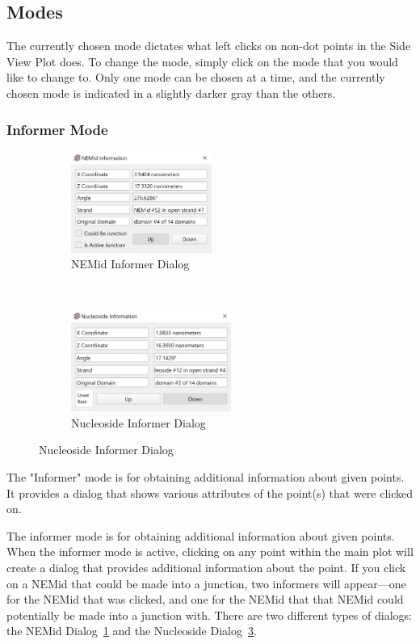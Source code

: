 \documentclass[titlepage]{article}
\begin{document}
	\subsection{Modes}
	The currently chosen mode dictates what left clicks on non-dot points in the Side View Plot does. To change the mode, simply click on the mode that you would like to change to. Only one mode can be chosen at a time, and the currently chosen mode is indicated in a slightly darker gray than the others.
	
	\subsubsection{Informer Mode}
	
	\begin{figure}[h]
		\caption{Informer Dialogs}
		\centering
		\begin{subfigure}{.3\textheight}
			\centering
			\includegraphics[height=1.3in]{NEMid-informer.png}
			\caption{NEMid Informer Dialog}
			\label{fig:NEMid-informer}
		\end{subfigure}%
		~
		\begin{subfigure}{.3\textheight}
			\centering
			\includegraphics[height=1.3in]{nucleoside-informer.png}
			\caption{Nucleoside Informer Dialog}
			\label{fig:nucleoside-informer}
		\end{subfigure}
	\end{figure}
	
	The "Informer" mode is for obtaining additional information about given points. It provides a dialog that shows various attributes of the point(s) that were clicked on.

	The informer mode is for obtaining additional information about given points. When the informer mode is active, clicking on any point within the main plot will create a dialog that provides additional information about the point. If you click on a NEMid that could be made into a junction, two informers will appear---one for the NEMid that was clicked, and one for the NEMid that that NEMid could potentially be made into a junction with. There are two different types of dialogs: the NEMid Dialog~\ref{fig:NEMid-informer} and the Nucleoside Dialog~\ref{fig:nucleoside-informer}.
	
\end{document}
